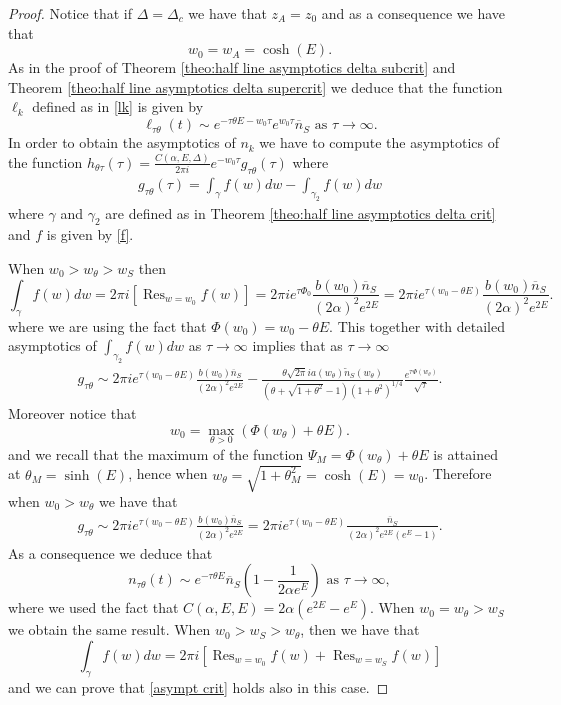 \documentclass{article}
\numberwithin{equation}{section}
\theoremstyle{plain}
\begin{document}
\begin{proof}
Notice that if $\Delta = \Delta_c $ we have that $z_A=z_0$ and as a consequence we have that 
\[
w_0=w_A= \cosh(E). 
\]
As in the proof of Theorem \ref{theo:half line asymptotics delta subcrit} and Theorem \ref{theo:half line asymptotics delta supercrit} we deduce that the function $\ell_k $ defined as in \eqref{lk} is given by 
\[
\ell_{\tau \theta }(t)\sim  e^{- \tau \theta  E - w_0 \tau } e^{ w_0 \tau }  \overline n_S \text{ as } \tau \to \infty.  
\]
In order to obtain the asymptotics of $n_{k} $ we have to compute the asymptotics of the function $h_{\theta \tau} (\tau)=   \frac{C(\alpha, E, \Delta)}{2 \pi i } e^{- w_0 \tau }g_{\tau \theta} (\tau )  $ where 
\begin{align*}
g_{\tau \theta} (\tau)= \int_{\gamma} f(w)  dw  - \int_{\gamma_2} f(w)   dw
\end{align*} 
where $\gamma $ and $\gamma_2$ are defined as in Theorem \ref{theo:half line asymptotics delta crit} and $f$ is given by \eqref{f}. 

When $w_0 > w_\theta > w_S  $ then 
\[ 
\int_{\gamma} f(w)  dw =  2 \pi i \left[ \operatorname{Res}_{ w =w_0} f(w)   \right] = 2 \pi i e^{\tau \Phi_0} \frac{b(w_0)  \overline n_S }{(2 \alpha)^2 e^{2E} } = 2 \pi i e^{\tau (w_0- \theta E)} \frac{b(w_0)  \overline n_S }{(2 \alpha)^2 e^{2E} }. 
\]
where we are using the fact that $\Phi(w_0)=w_0 - \theta E.$
This together with detailed asymptotics of  $\int_{\gamma_2} f(w) dw$ as $\tau \rightarrow \infty $ implies that as $\tau \to \infty $
\begin{align*}
g_{\tau \theta } \sim 
2 \pi i e^{\tau (w_0- \theta E)} \frac{b(w_0)  \overline n_S }{(2 \alpha)^2 e^{2E} }  - \frac{  \theta  \sqrt{2 \pi } i  a(w_\theta ) \tilde{n}_S(w_\theta )}{(\theta+ \sqrt{1+ \theta^2 } - 1) (1+\theta^2)^{1/4}} \frac{ e^{ \tau \Phi(w_\theta ) }}{\sqrt{\tau}}. 
\end{align*}
Moreover notice that
\[ 
w_0= \max_{\theta >0} \left(\Phi(w_\theta ) + \theta E \right). 
\]
and we recall that the maximum of the function $\Psi_M =  \Phi(w_\theta ) + \theta E$ is attained  at $\theta_M = \sinh(E)$, hence when $w_\theta= \sqrt{1+ \theta_M^2 } = \cosh(E)= w_0$. 
Therefore when $w_0> w_\theta $ we have that 
\begin{align*}
g_{\tau \theta } \sim 
2 \pi i e^{\tau (w_0- \theta E)} \frac{b(w_0)  \overline n_S }{(2 \alpha)^2 e^{2E} } =2 \pi i e^{\tau (w_0- \theta E)} \frac{  \overline n_S }{(2 \alpha)^2 e^{2E} (e^E-1)} . 
\end{align*}
As a consequence we deduce that 
\begin{equation} \label{asympt crit}
n_{\tau \theta } (t) \sim e^{- \tau \theta  E }\overline n_S  \left( 1- \frac{1 }{2 \alpha e^{E} } \right) \text{ as } \tau \to \infty,
\end{equation}
where we used the fact that $C(\alpha, E, E)=  2 \alpha (e^{2E} - e^E )$. 
When $w_0 = w_\theta > w_S  $ we obtain the same result. 
When $ w_0 > w_S > w_\theta $, then we have that
\[
\int_{\gamma} f(w)  dw = 2 \pi i \left[ \operatorname{Res}_{ w =w_0} f(w)  + \operatorname{Res}_{ w =w_S} f(w)  \right] 
\]
and we can prove that \eqref{asympt crit} holds also in this case. 


\end{proof}
\end{document}
